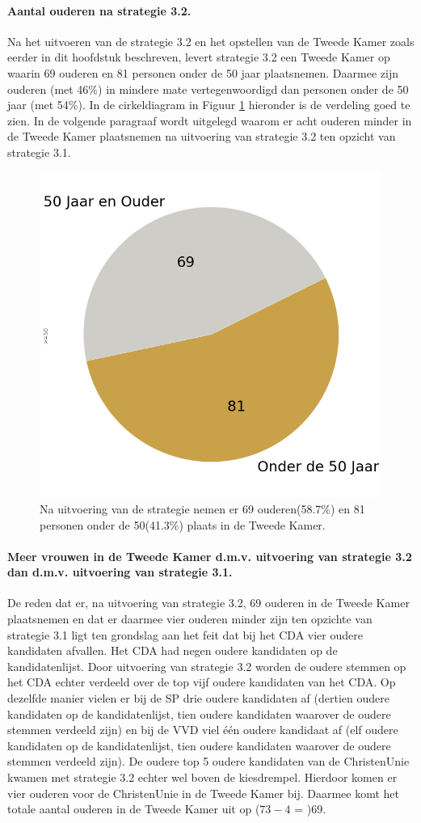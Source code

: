 \paragraph{Aantal ouderen na strategie 3.2.}
Na het uitvoeren van de strategie 3.2 en het opstellen van de Tweede Kamer zoals eerder in dit hoofdstuk beschreven, levert strategie 3.2 een Tweede Kamer op waarin 69 ouderen en 81 personen onder de 50 jaar plaatsnemen. Daarmee zijn ouderen (met 46\%) in mindere mate vertegenwoordigd dan personen onder de 50 jaar (met 54\%). In de cirkeldiagram in Figuur \ref{fig:pcS32O} hieronder is de verdeling goed te zien. In de volgende paragraaf wordt uitgelegd waarom er acht ouderen minder in de Tweede Kamer plaatsnemen na uitvoering van strategie 3.2 ten opzicht van strategie 3.1.

\begin{figure}[H]
\centering
	\includegraphics[width=0.40\linewidth]{pie_chart_eigenX_ouderen.png}

\caption{Na uitvoering van de strategie nemen er 69 ouderen(58.7\%) en 81 personen onder de 50(41.3\%) plaats in de Tweede Kamer.} 

\label{fig:pcS32O}
\end{figure}

\paragraph{Meer vrouwen in de Tweede Kamer d.m.v. uitvoering van strategie 3.2 dan d.m.v. uitvoering van strategie 3.1.}
De reden dat er, na uitvoering van strategie 3.2, 69 ouderen in de Tweede Kamer plaatsnemen en dat er daarmee vier ouderen minder zijn ten opzichte van strategie 3.1 ligt ten grondslag aan het feit dat bij het CDA vier oudere kandidaten afvallen. Het CDA had negen oudere kandidaten op de kandidatenlijst. Door uitvoering van strategie 3.2 worden de oudere stemmen op het CDA echter verdeeld over de top vijf oudere kandidaten van het CDA. Op dezelfde manier vielen er bij de SP drie oudere kandidaten af (dertien oudere kandidaten op de kandidatenlijst, tien oudere kandidaten waarover de oudere stemmen verdeeld zijn) en bij de VVD viel één oudere kandidaat af (elf oudere kandidaten op de kandidatenlijst, tien oudere kandidaten waarover de oudere stemmen verdeeld zijn). De oudere top 5 oudere kandidaten van de ChristenUnie kwamen met strategie 3.2 echter wel boven de kiesdrempel. Hierdoor komen er vier ouderen voor de ChristenUnie in de Tweede Kamer bij. Daarmee komt het totale aantal ouderen in de Tweede Kamer uit op ($73-4$ = )69.








